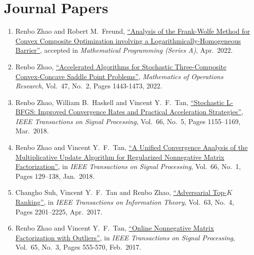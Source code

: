 \documentclass[11pt]{article}
\newcommand{\TSP}{IEEE Transactions on Signal Processing}
\newcommand{\TIT}{IEEE Transactions on Information Theory}
\newcommand{\MOR}{Mathematics of Operations Research}
\newcommand{\MPA}{Mathematical Programming (Series A)}
\begin{document}

\section*{\large Journal Papers}

\begin{enumerate}[label=J\arabic*.]\setlength{\leftskip}{2ex}
\item Renbo Zhao and Robert M.\ Freund,  \href{https://link.springer.com/article/10.1007/s10107-022-01820-9}{``Analysis of the Frank-Wolfe Method for Convex Composite Optimization involving a Logarithmically-Homogeneous Barrier''},  accepted in {\em \MPA}, Apr.\ 2022.
\item {Renbo Zhao},  \href{https://pubsonline.informs.org/doi/abs/10.1287/moor.2021.1175?journalCode=moor}{``Accelerated Algorithms for Stochastic Three-Composite Convex-Concave Saddle Point Problems''},  {\em \MOR}, Vol.\ 47, No.\ 2, Pages 1443-1473, 2022.
\item {Renbo Zhao}, William B.\ Haskell and Vincent Y.\ F.\ Tan,  \href{https://ieeexplore.ieee.org/document/8219748}{``Stochastic L-BFGS: Improved Convergence Rates and Practical Acceleration Strategies''},    {\em \TSP}, Vol.\ 66, No.\ 5, Pages 1155–1169, Mar.\ 2018.
\item {Renbo Zhao} and Vincent Y.\ F.\ Tan,   \href{https://ieeexplore.ieee.org/document/8052526}{``A Unified Convergence Analysis of the Multiplicative Update Algorithm for Regularized Nonnegative Matrix Factorization''},  in {\em \TSP}, Vol.\ 66, No.\ 1, Pages 129–138, Jan.\  2018.
\item Changho Suh, Vincent Y.\ F.\ Tan and {Renbo Zhao},   \href{https://ieeexplore.ieee.org/document/7835206}{``Adversarial Top-$K$ Ranking''},   in {\em \TIT}, Vol.\ 63, No.\ 4, Pages 2201–2225, Apr.\ 2017.
\item {Renbo Zhao} and Vincent Y.\ F.\ Tan,   \href{https://ieeexplore.ieee.org/document/7676413}{``Online Nonnegative Matrix Factorization with Outliers''},  in {\em \TSP}, Vol.\ 65, No.\ 3, Pages 555-570, Feb.\ 2017. 

\end{enumerate}
\end{document}
